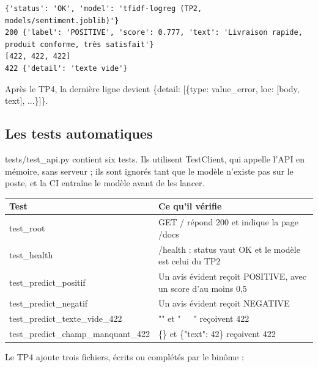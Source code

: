 \documentclass[11pt,a4paper]{article}
\newcommand{\co}[1]{{\ttfamily\hyphenchar\font=45\relax #1}}
\begin{document}
\begin{attendu}
\begin{lstlisting}
{'status': 'OK', 'model': 'tfidf-logreg (TP2, models/sentiment.joblib)'}
200 {'label': 'POSITIVE', 'score': 0.777, 'text': 'Livraison rapide, produit conforme, très satisfait'}
[422, 422, 422]
422 {'detail': 'texte vide'}
\end{lstlisting}
Après le TP4, la dernière ligne devient
\co{422 \{\textquotesingle{}detail\textquotesingle{}: [\{\textquotesingle{}type\textquotesingle{}: \textquotesingle{}value\_error\textquotesingle{}, \textquotesingle{}loc\textquotesingle{}: [\textquotesingle{}body\textquotesingle{}, \textquotesingle{}text\textquotesingle{}], ...\}]\}}.
\end{attendu}

\subsection{Les tests automatiques}

\co{tests/test\_api.py} contient six tests. Ils utilisent \co{TestClient}, qui appelle l'API en mémoire,
sans serveur ; ils sont ignorés tant que le modèle n'existe pas sur le poste, et la CI entraîne le modèle
avant de les lancer.

\begin{center}
\begin{tabularx}{\textwidth}{@{}l X@{}}
\toprule
\textbf{Test} & \textbf{Ce qu'il vérifie} \\
\midrule
\co{test\_root} & \co{GET /} répond 200 et indique la page \co{/docs} \\
\co{test\_health} & \co{/health} : \co{status} vaut \co{OK} et le modèle est celui du TP2 \\
\co{test\_predict\_positif} & Un avis évident reçoit \co{POSITIVE}, avec un score d'au moins 0,5 \\
\co{test\_predict\_negatif} & Un avis évident reçoit \co{NEGATIVE} \\
\co{test\_predict\_texte\_vide\_422} & \co{""} et \co{"\ \ \ "} reçoivent 422 \\
\co{test\_predict\_champ\_manquant\_422} & \co{\{\}} et \co{\{"text": 42\}} reçoivent 422 \\
\bottomrule
\end{tabularx}
\end{center}

Le TP4 ajoute trois fichiers, écrits ou complétés par le binôme :
\end{document}
